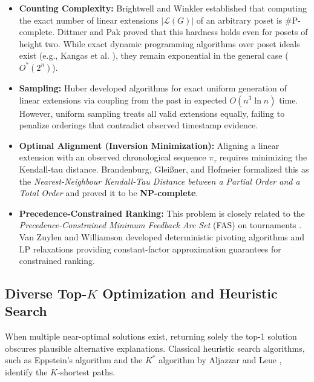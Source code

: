 \documentclass[journal]{IEEEtran}
\begin{document}
\begin{itemize}
    \item \textbf{Counting Complexity:} Brightwell and Winkler \cite{Brightwell1991} established that computing the exact number of linear extensions $|\mathcal{L}(G)|$ of an arbitrary poset is $\#\text{P}$-complete. Dittmer and Pak \cite{Dittmer2020} proved that this hardness holds even for posets of height two. While exact dynamic programming algorithms over poset ideals exist (e.g., Kangas et al. \cite{Kangas2016}), they remain exponential in the general case ($O^*(2^n)$).
    \item \textbf{Sampling:} Huber \cite{Huber2006} developed algorithms for exact uniform generation of linear extensions via coupling from the past in expected $O(n^3 \ln n)$ time. However, uniform sampling treats all valid extensions equally, failing to penalize orderings that contradict observed timestamp evidence.
    \item \textbf{Optimal Alignment (Inversion Minimization):} Aligning a linear extension with an observed chronological sequence $\pi_\tau$ requires minimizing the Kendall-tau distance. Brandenburg, Gleißner, and Hofmeier \cite{Brandenburg2011} formalized this as the \emph{Nearest-Neighbour Kendall-Tau Distance between a Partial Order and a Total Order} and proved it to be \textbf{NP-complete}.
    \item \textbf{Precedence-Constrained Ranking:} This problem is closely related to the \emph{Precedence-Constrained Minimum Feedback Arc Set} (FAS) on tournaments \cite{Mastrolilli2011}. Van Zuylen and Williamson \cite{vanZuylen2009} developed deterministic pivoting algorithms and LP relaxations providing constant-factor approximation guarantees for constrained ranking.
\end{itemize}

\subsection{Diverse Top-$K$ Optimization and Heuristic Search}
When multiple near-optimal solutions exist, returning solely the top-1 solution obscures plausible alternative explanations. Classical heuristic search algorithms, such as Eppstein’s algorithm \cite{Eppstein1998} and the $K^*$ algorithm by Aljazzar and Leue \cite{Aljazzar2011}, identify the $K$-shortest paths.
\end{document}
